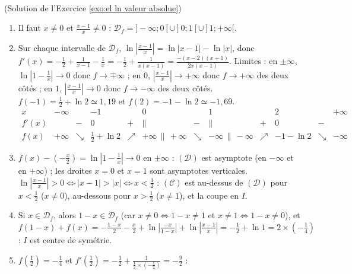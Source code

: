 \begin{corrige}
\begin{sol} ~ \\
(Solution de l'Exercice \ref{exo:el ln valeur absolue})
\begin{enumerate}
\item Il faut $x \neq 0$ et $\frac{x-1}{x} \neq 0$ : $\mathcal{D}_f = ]-\infty;0[ \cup ]0;1[ \cup ]1;+\infty[$.
\item Sur chaque intervalle de $\mathcal{D}_f$, $\ln\left|\frac{x-1}{x}\right| = \ln|x-1| - \ln|x|$, donc
      $f'(x) = -\frac{1}{2} + \frac{1}{x-1} - \frac{1}{x} = -\frac{1}{2} + \frac{1}{x(x-1)} = \frac{-(x-2)(x+1)}{2x(x-1)}$.
      Limites : en $\pm\infty$, $\ln\left|1 - \frac{1}{x}\right| \to 0$ donc $f \to \mp\infty$ ; en $0$, $\left|\frac{x-1}{x}\right| \to +\infty$ donc
      $f \to +\infty$ des deux c\^ot\'es ; en $1$, $\left|\frac{x-1}{x}\right| \to 0$ donc $f \to -\infty$ des deux c\^ot\'es.
      $f(-1) = \frac{1}{2} + \ln 2 \simeq 1{,}19$ et $f(2) = -1 - \ln 2 \simeq -1{,}69$.
      \[
      \begin{array}{c|ccccccccccc}
      x & -\infty & & -1 & & 0 & & 1 & & 2 & & +\infty \\ \hline
      f'(x) & & - & 0 & + & \| & - & \| & + & 0 & - & \\ \hline
      f(x) & +\infty & \searrow & \frac{1}{2} + \ln 2 & \nearrow & +\infty \, \| \, +\infty & \searrow & -\infty \, \| \, -\infty & \nearrow & -1 - \ln 2 & \searrow & -\infty
      \end{array}
      \]
\item $f(x) - \left(-\frac{x}{2}\right) = \ln\left|1 - \frac{1}{x}\right| \to 0$ en $\pm\infty$ : $(\mathcal{D})$ est asymptote (en $-\infty$ et en $+\infty$) ;
      les droites $x = 0$ et $x = 1$ sont asymptotes verticales.
      $\ln\left|\frac{x-1}{x}\right| > 0 \iff |x - 1| > |x| \iff x < \frac{1}{2}$ : $(\mathscr{C})$ est au-dessus de $(\mathcal{D})$ pour
      $x < \frac{1}{2}$ ($x \neq 0$), au-dessous pour $x > \frac{1}{2}$ ($x \neq 1$), et la coupe en $I$.
\item Si $x \in \mathcal{D}_f$, alors $1 - x \in \mathcal{D}_f$ (car $x \neq 0 \iff 1-x \neq 1$ et $x \neq 1 \iff 1 - x \neq 0$), et
      $f(1-x) + f(x) = -\frac{1-x}{2} - \frac{x}{2} + \ln\left|\frac{-x}{1-x}\right| + \ln\left|\frac{x-1}{x}\right| = -\frac{1}{2} + \ln 1 = 2 \times \left(-\frac{1}{4}\right)$ :
      $I$ est centre de sym\'etrie.
\item $f\left(\frac{1}{2}\right) = -\frac{1}{4}$ et $f'\left(\frac{1}{2}\right) = -\frac{1}{2} + \frac{1}{\frac{1}{2} \times \left(-\frac{1}{2}\right)} = -\frac{9}{2}$ :

\end{enumerate}
\end{sol}
\end{corrige}
